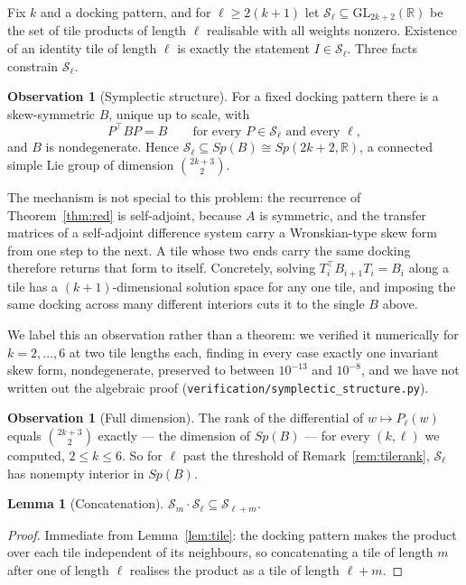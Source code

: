 \documentclass[11pt]{article}
\newtheorem{lemma}[theorem]{Lemma}
\theoremstyle{definition}
\newtheorem{observation}[theorem]{Observation}
\begin{document}
Fix $k$ and a docking pattern, and for $\ell\ge2(k+1)$ let
$\mathcal S_\ell\subseteq\mathrm{GL}_{2k+2}(\mathbb R)$ be the set of tile
products of length $\ell$ realisable with all weights nonzero. Existence of an
identity tile of length $\ell$ is exactly the statement $I\in\mathcal S_\ell$.
Three facts constrain $\mathcal S_\ell$.

\begin{observation}[Symplectic structure]\label{obs:symp}
For a fixed docking pattern there is a skew-symmetric $B$, unique up to scale,
with
\[
  P^{\!\top}BP=B\qquad\text{for every }P\in\mathcal S_\ell\text{ and every }\ell,
\]
and $B$ is nondegenerate. Hence $\mathcal S_\ell\subseteq Sp(B)\cong
Sp(2k+2,\mathbb R)$, a connected simple Lie group of dimension
$\binom{2k+3}2$.
\end{observation}

The mechanism is not special to this problem: the recurrence of
Theorem~\ref{thm:red} is self-adjoint, because $A$ is symmetric, and the
transfer matrices of a self-adjoint difference system carry a Wronskian-type
skew form from one step to the next. A tile whose two ends carry the same
docking therefore returns that form to itself. Concretely, solving
$T_i^{\!\top}B_{i+1}T_i=B_i$ along a tile has a $(k+1)$-dimensional solution
space for any one tile, and imposing the same docking across many different
interiors cuts it to the single $B$ above.

We label this an observation rather than a theorem: we verified it numerically
for $k=2,\dots,6$ at two tile lengths each, finding in every case exactly one
invariant skew form, nondegenerate, preserved to between $10^{-13}$ and
$10^{-8}$, and we have not written out the algebraic proof
(\texttt{verification/symplectic\_structure.py}).

\begin{observation}[Full dimension]\label{obs:fulldim}
The rank of the differential of $w\mapsto P_\ell(w)$ equals $\binom{2k+3}2$
exactly --- the dimension of $Sp(B)$ --- for every $(k,\ell)$ we computed,
$2\le k\le6$. So for $\ell$ past the threshold of
Remark~\ref{rem:tilerank}, $\mathcal S_\ell$ has nonempty interior in $Sp(B)$.
\end{observation}

\begin{lemma}[Concatenation]\label{lem:concat}
$\mathcal S_m\cdot\mathcal S_\ell\subseteq\mathcal S_{\ell+m}$.
\end{lemma}

\begin{proof}
Immediate from Lemma~\ref{lem:tile}: the docking pattern makes the product over
each tile independent of its neighbours, so concatenating a tile of length $m$
after one of length $\ell$ realises the product as a tile of length $\ell+m$.
\end{proof}
\end{document}
